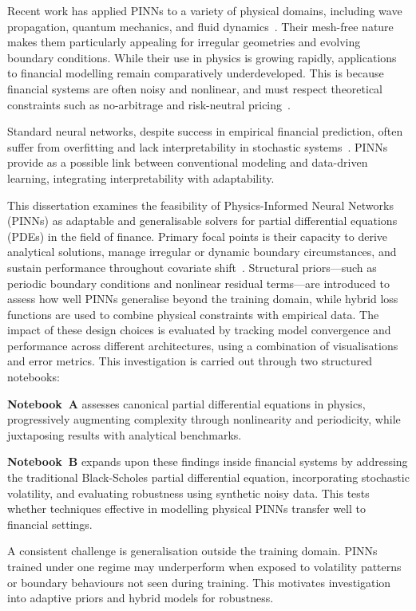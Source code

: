 \documentclass[12pt,a4paper]{article}
\begin{document}
Recent work has applied PINNs to a variety of physical domains, including wave propagation, quantum mechanics, and fluid dynamics~\cite{cuomo2022scientific}. Their mesh-free nature makes them particularly appealing for irregular geometries and evolving boundary conditions. While their use in physics is growing rapidly, applications to financial modelling remain comparatively underdeveloped. This is because financial systems are often noisy and nonlinear, and must respect theoretical constraints such as no-arbitrage and risk-neutral pricing~\cite{sirignano2018deep}.

Standard neural networks, despite success in empirical financial prediction, often suffer from overfitting and lack interpretability in stochastic systems~\cite{tang2023data}. PINNs provide as a possible link between conventional modeling and data-driven learning, integrating interpretability with adaptability.

This dissertation examines the feasibility of Physics-Informed Neural Networks (PINNs) as adaptable and generalisable solvers for partial differential equations (PDEs) in the field of finance.  Primary focal points is their capacity to derive analytical solutions, manage irregular or dynamic boundary circumstances, and sustain performance throughout covariate shift~\cite{quinonero2009dataset}. Structural priors—such as periodic boundary conditions and nonlinear residual terms—are introduced to assess how well PINNs generalise beyond the training domain, while hybrid loss functions are used to combine physical constraints with empirical data.
The impact of these design choices is evaluated by tracking model convergence and performance across different architectures, using a combination of visualisations and error metrics. This investigation is carried out through two structured notebooks:

\textbf{Notebook~A} assesses canonical partial differential equations in physics, progressively augmenting complexity through nonlinearity and periodicity, while juxtaposing results with analytical benchmarks.

\textbf{Notebook~B} expands upon these findings inside financial systems by addressing the traditional Black-Scholes partial differential equation, incorporating stochastic volatility, and evaluating robustness using synthetic noisy data.
This tests whether techniques effective in modelling physical PINNs transfer well to financial settings.

A consistent challenge is generalisation outside the training domain. PINNs trained under one regime may underperform when exposed to volatility patterns or boundary behaviours not seen during training. This motivates investigation into adaptive priors and hybrid models for robustness.
\end{document}
